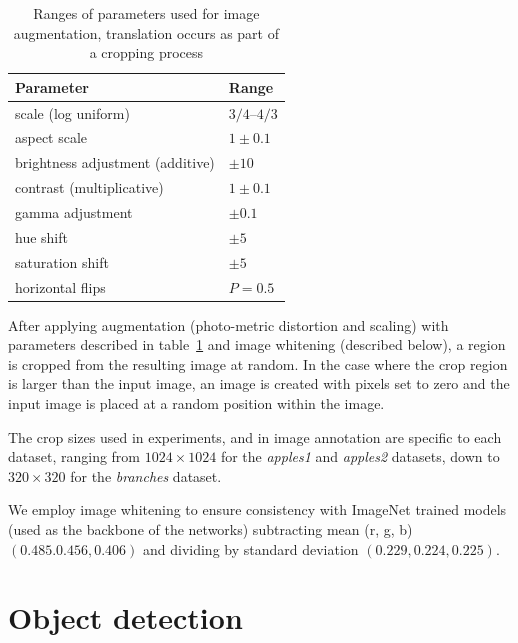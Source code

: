 \begin{table}[h]
  \centering
    \caption{Ranges of parameters used for image augmentation, translation occurs as part of a cropping process}
    
  \begin{tabular}{ l  l }
    Parameter & Range \\
    \toprule
    scale (log uniform) & ${3/4}$--${4/3}$  \\ 
    aspect scale  & $ 1 \pm 0.1 $  \\ 

    brightness adjustment (additive) & $ \pm 10 $ \\ 
    contrast (multiplicative) & $ 1 \pm 0.1 $ \\ 

    gamma adjustment & $ \pm 0.1 $ \\ 

    hue shift & $ \pm 5 $ \\ 
    saturation shift & $ \pm 5 $ \\ 
    
    horizontal flips & $ P = 0.5 $ \\ 
    
    \bottomrule
  \end{tabular}
\label{fig:obj_augmentation}
\end{table}

After applying augmentation (photo-metric distortion and scaling) with parameters described in table~\ref{fig:obj_augmentation} and image whitening (described below), a region is cropped from the resulting image at random. In the case where the crop region is larger than the input image, an image is created with pixels set to zero and the input image is placed at a random position within the image.

The crop sizes used in experiments, and in image annotation are specific to each dataset, ranging from $1024\times1024$ for the \emph{apples1} and \emph{apples2} datasets, down to $320\times320$ for the \emph{branches} dataset.

We employ image whitening to ensure consistency with ImageNet trained models (used as the backbone of the networks) subtracting mean (r, g, b) $ (0.485. 0.456, 0.406) $ and dividing by standard deviation $ (0.229, 0.224, 0.225) $.


\section {Object detection}

